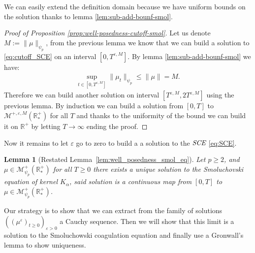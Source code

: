 \documentclass[11pt,a4paper]{article}
\newcommand{\RR}{\mathbb{R}}
\newcommand{\RRP}{\mathbb{R}^+_*}
\newcommand{\MC}{\mathcal{M}}
\newcommand{\SCE}{\emph{SCE}}
\newcommand{\Proc}[1]{\left(#1\right)_{t\geq 0}}
\newtheorem{lemma}[theorem]{Lemma}
\begin{document}
We can easily extend the definition domain because we have uniform bounds on the solution thanks to lemma \ref{lem:sub-add-bounf-smol}.
\begin{proof}[Proof of Proposition \ref{prop:well-posedness-cutoff-smol}]
    Let us denote $M:= \|\mu\|_{\psi_p}$, from the previous lemma we know that we can build a solution to \eqref{eq:cutoff_SCE} on an interval $\left[0,T^{\varepsilon,M}\right]$. By lemma \ref{lem:sub-add-bounf-smol} we have:
    \begin{align*}
        \sup\limits_{t \in \left[0,T^{\varepsilon,M}\right]} \|\mu_t\|_{\psi_p} \leq \|\mu\| = M.
    \end{align*}
    Therefore we can build another solution on interval $\left[T^{\varepsilon,M}, 2T^{\varepsilon,M}\right]$ using the previous lemma. By induction we can build a solution from $[0,T]$ to $\MC^{+,\varepsilon,M}\left(\RRP\right)$ for all $T$ and thanks to the uniformity of the bound we can build it on $\RR^{+}$ by letting $T \to \infty$ ending the proof.
\end{proof}
Now it remains to let $\varepsilon$ go to zero to build a a solution to the $\SCE$ \eqref{eq:SCE}. 
\begin{lemma}[Restated Lemma~\ref{lem:well_posedness_smol_eq}]
    Let $p \geq 2$, and $\mu \in \MC_{\psi_p}^+ (\RRP)$ for all $T \geq 0$ there exists a unique solution to the Smoluchovski equation of kernel $K_\alpha$, said solution is a continuous map from $[0,T]$ to $\mu \in \MC_{\psi_p}^+ (\RRP)$.
\end{lemma}
Our strategy is to show that we can extract from the family of solutions $\left(\Proc{\mu^\varepsilon}\right)_{\varepsilon > 0}$ a Cauchy sequence. Then we will show that this limit is a solution to the Smoluchowski coagulation equation and finally use a Gronwall's lemma to show uniqueness. 
\end{document}

